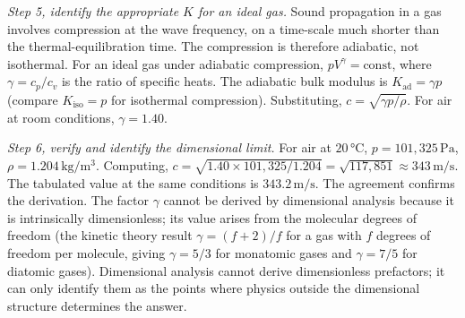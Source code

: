 \begin{exercise}
\textit{Step 5, identify the appropriate $K$ for an ideal gas.} Sound
propagation in a gas involves compression at the wave frequency, on
a time-scale much shorter than the thermal-equilibration time. The
compression is therefore adiabatic, not isothermal. For an
ideal gas under adiabatic compression, $p V^{\gamma} = \text{const}$,
where $\gamma = c_{p}/c_{v}$ is the ratio of specific heats. The
adiabatic bulk modulus is $K_{\text{ad}} = \gamma p$ (compare
$K_{\text{iso}} = p$ for isothermal compression). Substituting,
$c = \sqrt{\gamma p / \rho}$. For air at room conditions,
$\gamma = 1.40$.

\textit{Step 6, verify and identify the dimensional limit.} For air
at $20 \,\si{\degreeCelsius}$, $p = 101{,}325 \,\si{\pascal}$,
$\rho = 1.204 \,\si{\kilogram\per\meter\cubed}$. Computing,
$c = \sqrt{1.40 \times 101{,}325 / 1.204} = \sqrt{117{,}851}
\approx 343 \,\si{\meter\per\second}$. The tabulated value at the
same conditions is $343.2 \,\si{\meter\per\second}$. The agreement
confirms the derivation. The factor $\gamma$ cannot be derived by
dimensional analysis because it is intrinsically dimensionless;
its value arises from the molecular degrees of freedom (the kinetic
theory result $\gamma = (f + 2)/f$ for a gas with $f$ degrees of
freedom per molecule, giving $\gamma = 5/3$ for monatomic gases and
$\gamma = 7/5$ for diatomic gases). Dimensional analysis cannot
derive dimensionless prefactors; it can only identify them as the
points where physics outside the dimensional structure determines
the answer.
\end{exercise}

